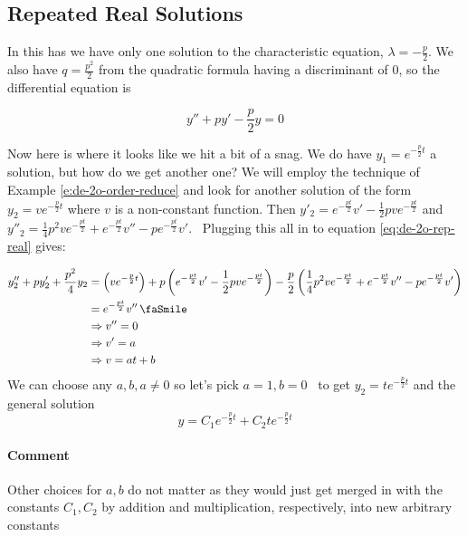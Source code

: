 \documentclass[letterpaper, 11pt, openany]{book}
\theoremstyle{mytheoremstyle}
\theoremstyle{myexamplestyle}
\newenvironment{commentary}{\paragraph{\sffamily \smaller \fontseries{b}\selectfont Comment}}{}
\begin{document}
\subsection{Repeated Real Solutions}

In this has we have only one solution to the characteristic equation, \(\lambda = -\frac{p}{2}\). We also have \(q = \frac{p^{2}}{2}\) from the quadratic formula having a discriminant of 0, so the differential equation is

\begin{equation}\label{eq:de-2o-rep-real}
    y'' + p y' -\frac{p}{2} y = 0
\end{equation}

Now here is where it looks like we hit a bit of a snag. We do have \(y_{1} = e^{-\frac{p}{2} t}\) a solution, but how do we get another one? We will employ the technique of Example \ref{e:de-2o-order-reduce} and look for another solution of the form \(y_{2} = v e^{-\frac{p}{2} t}\) where \(v\) is a non-constant function. Then \(y'_{2} = e^{-\frac{p t}{2}} v'-\frac{1}{2} p v e^{-\frac{p t}{2}}\) and \(y''_{2} = \frac{1}{4} p^2 v e^{-\frac{p t}{2}}+e^{-\frac{p t}{2}} v''-p
e^{-\frac{p t}{2}} v'\). \faMeh \, Plugging this all in to equation \eqref{eq:de-2o-rep-real} gives:

\begin{align*}
    y''_{2} + p y'_{2} + \frac{p^{2}}{4} y_{2} &= \left(v e^{-\frac{p}{2} t}\right) + p \left(e^{-\frac{p t}{2}} v'-\frac{1}{2} p v e^{-\frac{p t}{2}}\right) -\frac{p}{2}\left(\frac{1}{4} p^2 v e^{-\frac{p t}{2}}+e^{-\frac{p t}{2}} v''-p
e^{-\frac{p t}{2}} v'\right)\\
        &= e^{-\frac{p t}{2}} v'' \, \text{\faSmile}\\
        &\Rightarrow v'' = 0\\
        &\Rightarrow v' = a\\
        &\Rightarrow v = at + b
\end{align*}
We can choose any \(a,b, a \neq 0\) so let's pick \(a=1, b=0\) \faSmile \, to get \(y_{2} = t e^{-\frac{p}{2} t}\) and the general solution
\[y = C_{1} e^{-\frac{p}{2} t} + C_{2} t e^{-\frac{p}{2} t}\]

\begin{commentary}
    Other choices for \(a,b\) do not matter as they would just get merged in with the constants \(C_{1}, C_{2}\) by addition and multiplication, respectively, into new arbitrary constants
\end{commentary}
\end{document}
